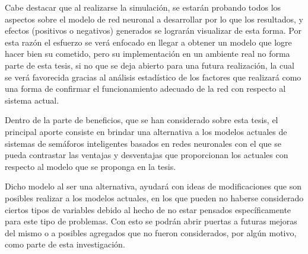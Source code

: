 		Cabe destacar que al realizarse la simulaci\'{o}n, se estar\'{a}n probando todos los
	aspectos sobre el modelo de red neuronal a desarrollar por lo que los
	resultados, y efectos (positivos o negativos) generados se lograr\'{a}n visualizar
	de esta forma. Por esta raz\'{o}n el esfuerzo se ver\'{a} enfocado en llegar a obtener un modelo que logre hacer bien su cometido, pero su implementaci\'{o}n en un ambiente real no forma parte de esta tesis, si no que se deja abierto para una futura realizaci\'{o}n, la cual se ver\'{a} favorecida gracias al an\'{a}lisis estad\'{i}stico de los factores que realizar\'{a} como una forma de confirmar el funcionamiento adecuado de la red con respecto al sistema actual.
	
	
	
		Dentro de la parte de beneficios, que se han considerado sobre esta
		tesis, el principal aporte  consiste en brindar una alternativa a los modelos actuales de sistemas de sem\'{a}foros inteligentes basados en redes
	neuronales con el que se pueda contrastar las ventajas y desventajas que
	proporcionan los actuales con respecto al modelo que se proponga en la tesis.
	
		Dicho modelo al ser una alternativa, ayudar\'{a} con ideas de modificaciones que
	son posibles realizar a los modelos actuales, en los que pueden no haberse
	considerado ciertos tipos de variables debido al hecho de no estar pensados espec\'{i}ficamente para este tipo de problemas. Con esto se podr\'{a}n abrir puertas a futuras mejoras del mismo o a posibles agregados que  no fueron considerados, por alg\'{u}n motivo, como parte de esta investigaci\'{o}n.
	
